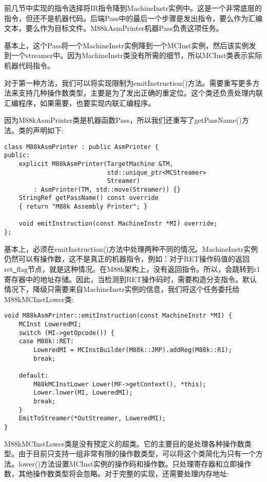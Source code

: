 前几节中实现的指令选择将IR指令降到MachineInstr实例中。这是一个非常底层的指令，但还不是机器代码。后端Pass中的最后一个步骤是发出指令，要么作为汇编文本，要么作为目标文件。M88kAsmPrinter机器Pass负责这项任务。\par

基本上，这个Pass将一个MachineInstr实例降到一个MCInst实例，然后该实例发到一个streamer中。因为MachineInstr类没有所需的细节，所以MCInst类表示实际机器代码指令。\par

对于第一种方法，我们可以将实现限制为emitInstruction()方法。需要重写更多方法来支持几种操作数类型，主要是为了发出正确的重定位。这个类还负责处理内联汇编程序，如果需要，也要实现内联汇编程序。\par

因为M88kAsmPrinter类是机器函数Pass，所以我们还重写了getPassName()方法。类的声明如下:\par

\begin{lstlisting}[caption={}]
class M88kAsmPrinter : public AsmPrinter {
public:
	explicit M88kAsmPrinter(TargetMachine &TM,
							std::unique_ptr<MCStreamer>
							Streamer)
		: AsmPrinter(TM, std::move(Streamer)) {}
	StringRef getPassName() const override
	{ return "M88k Assembly Printer"; }
	
	void emitInstruction(const MachineInstr *MI) override;
};
\end{lstlisting}

基本上，必须在emitInstruction()方法中处理两种不同的情况。MachineInstr实例仍然可以有操作数，这不是真正的机器指令，例如：对于RET操作码值的返回ret\underline{~}flag节点，就是这种情况。在M88k架构上，没有返回指令。所以，会跳转到r1寄存器中的地址存储。因此，当检测到RET操作码时，需要构造分支指令。默认情况下，降级只需要来自MachineInstr实例的信息，我们将这个任务委托给M88kMCInstLower类:\par

\begin{lstlisting}[caption={}]
void M88kAsmPrinter::emitInstruction(const MachineInstr *MI) {
	MCInst LoweredMI;
	switch (MI->getOpcode()) {
	case M88k::RET:
		LoweredMI = MCInstBuilder(M88k::JMP).addReg(M88k::R1);
		break;
		
	default:
		M88kMCInstLower Lower(MF->getContext(), *this);
		Lower.lower(MI, LoweredMI);
		break;
	}
	EmitToStreamer(*OutStreamer, LoweredMI);
}
\end{lstlisting}

M88kMCInstLower类是没有预定义的超类。它的主要目的是处理各种操作数类型。由于目前只支持一组非常有限的操作数类型，可以将这个类简化为只有一个方法。lower()方法设置MCInst实例的操作码和操作数。只处理寄存器和立即操作数，其他操作数类型将会忽略。对于完整的实现，还需要处理内存地址:\par

